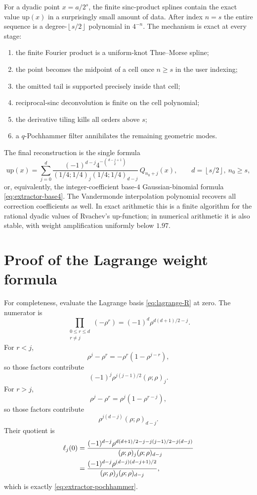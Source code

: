 \documentclass[11pt,oneside]{article}
\numberwithin{equation}{section}
\theoremstyle{definition}
\theoremstyle{remark}
\newcommand{\upf}{\mathrm{up}}
\newcommand{\floor}[1]{\left\lfloor #1\right\rfloor}
\begin{document}
For a dyadic point $x=a/2^s$, the finite sinc-product splines contain the exact
value $\upf(x)$ in a surprisingly small amount of data.  After index $n=s$ the
entire sequence is a degree-$\floor{s/2}$ polynomial in $4^{-n}$.  The mechanism
is exact at every stage:

\begin{enumerate}
\item the finite Fourier product is a uniform-knot Thue--Morse spline;
\item the point becomes the midpoint of a cell once $n\ge s$ in the user
indexing;
\item the omitted tail is supported precisely inside that cell;
\item reciprocal-sinc deconvolution is finite on the cell polynomial;
\item the derivative tiling kills all orders above $s$;
\item a $q$-Pochhammer filter annihilates the remaining geometric modes.
\end{enumerate}

The final reconstruction is the single formula
\[
 \upf(x)=\sum_{j=0}^{d}
 \frac{(-1)^{d-j}4^{-\binom{d-j+1}{2}}}
 {(1/4;1/4)_j(1/4;1/4)_{d-j}}\,Q_{n_0+j}(x),
 \qquad d=\floor{s/2},\ n_0\ge s,
\]
or, equivalently, the integer-coefficient base-$4$ Gaussian-binomial formula
\eqref{eq:extractor-base4}.  The Vandermonde interpolation polynomial recovers
all correction coefficients as well.  In exact arithmetic this is a finite
algorithm for the rational dyadic values of Rvachev's up-function; in numerical
arithmetic it is also stable, with weight amplification uniformly below $1.97$.

\appendix

\section{Proof of the Lagrange weight formula}

For completeness, evaluate the Lagrange basis \eqref{eq:lagrange-R} at zero.
The numerator is
\begin{equation}
 \prod_{\substack{0\le r\le d\\r\ne j}}(-\rho^r)
 =(-1)^d\rho^{d(d+1)/2-j}.
 \label{eq:lagrange-zero-numerator}
\end{equation}
For $r<j$,
\[
 \rho^j-\rho^r=-\rho^r(1-\rho^{j-r}),
\]
so those factors contribute
\[
 (-1)^j\rho^{j(j-1)/2}(\rho;\rho)_j.
\]
For $r>j$,
\[
 \rho^j-\rho^r=\rho^j(1-\rho^{r-j}),
\]
so those factors contribute
\[
 \rho^{j(d-j)}(\rho;\rho)_{d-j}.
\]
Their quotient is
\begin{align}
 \ell_j(0)
 &=\frac{(-1)^{d-j}
 \rho^{d(d+1)/2-j-j(j-1)/2-j(d-j)}}
 {(\rho;\rho)_j(\rho;\rho)_{d-j}}\notag\\
 &=\frac{(-1)^{d-j}\rho^{(d-j)(d-j+1)/2}}
 {(\rho;\rho)_j(\rho;\rho)_{d-j}},
 \label{eq:lagrange-weight-derived}
\end{align}
which is exactly \eqref{eq:extractor-pochhammer}.
\end{document}
